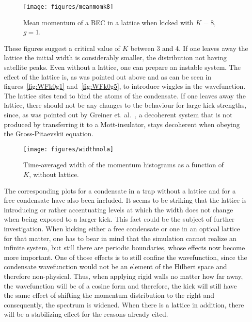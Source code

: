 \begin{figure}[H]
\begin{center}
\texttt{[image: figures/meanmomk8]}
\caption{Mean momentum of a BEC in a lattice when kicked with $K=8$, $g=1$.}
\label{fig:meanmomk8}
\end{center}
\end{figure}

These figures suggest a critical value of $K$ between 3 and 4. If one leaves away the lattice the initial width is considerably
smaller, the distribution not having satellite peaks. Even without a lattice, one can prepare an instable system. The effect of the lattice is, as was pointed out above and as can be seen in figures~\ref{fig:WFk0g1} and~\ref{fig:WFk0g5}, to introduce wiggles in the wavefunction. The lattice sites tend to bind the atoms of the condensate. If one leaves away the lattice, there should not be any changes to the behaviour for large kick strengths, since, as was pointed out by Greiner et. al.~\cite{esslinger}, a decoherent system that is not produced by transferring it to a Mott-insulator, stays decoherent when obeying the Gross-Pitaevskii equation. 


\begin{figure}[H]
\begin{center}
\texttt{[image: figures/widthnola]}
\caption{Time-averaged width of the momentum histograms as a function of $K$, without lattice.}
\label{fig:widthnola}
\end{center}
\end{figure}

The corresponding plots for a condensate in a trap without a lattice and for a free condensate have also been included.
It seems to be striking that the lattice is introducing or rather accentuating levels at which the width does not change when being exposed to a larger kick. This fact could be the subject of further investigation.
When kicking either a free condensate or one in an optical lattice for that matter, one has to bear in mind that the simulation cannot realize an infinite system, but still there are periodic boundaries, whose effects now become more important. One of those effects is to still confine the wavefunction, since the condensate wavefunction would not be an element of the Hilbert space and therefore non-physical. Thus, when applying rigid walls no matter how far away, the wavefunction will be of a cosine form and therefore, the kick will still have the same effect of shifting the momentum distribution to the right and consequently, the spectrum is widened. When there is a lattice in addition, there will be a stabilizing effect for the reasons already cited.


